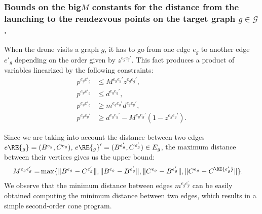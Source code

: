 

\subsubsection*{Bounds on the big$M$ constants for the distance from the launching to the rendezvous points on the target graph $g\in \mathcal{G}$.} 
\noindent
When the drone visits a graph $g$, it has to go from one edge $e_g$ to another edge $e'_g$ depending on the order given by $z^{e_ge_g'}$. This fact produces a product of variables linearized by the following constraints:
\begin{align*}
p^{e_ge'_g} & \leq M^{e_ge_g'} z^{e_ge_g'}, \\
p^{e_ge'_g} & \leq d^{e_ge_g'}, \\
p^{e_ge'_g} & \geq m^{e_ge_g'} d^{e_ge_g'}, \\
p^{e_ge_g'} & \geq d^{e_ge_g'} - M^{e_ge_g'}(1-z^{e_ge_g'}).
\end{align*}

\noindent
Since we are taking into account the distance between two edges $e\RE{_g}=(B^{e_g},C^{e_g}), \, e\RE{_g}'=(B^{e^\prime_g},C^{e^\prime_g})\in E_g$, the maximum distance between their vertices gives us the upper bound:
\begin{align*}
M^{e_g e^\prime_g} = & \max\{\|B^{e_g} - C^{e^\prime_g}\|, \|B^{e_g} - B^{e^\prime_g}\|, \|C^{e_g} - B^{e^\prime_g}\|, \|C^{e_g} - C^{\RE{e'_g}}\|\}. 
\end{align*}
We observe that the minimum distance between edges $m^{e_g e^\prime_g}$ can be easily obtained computing the minimum distance between two edges, which results in a simple second-order cone program.


